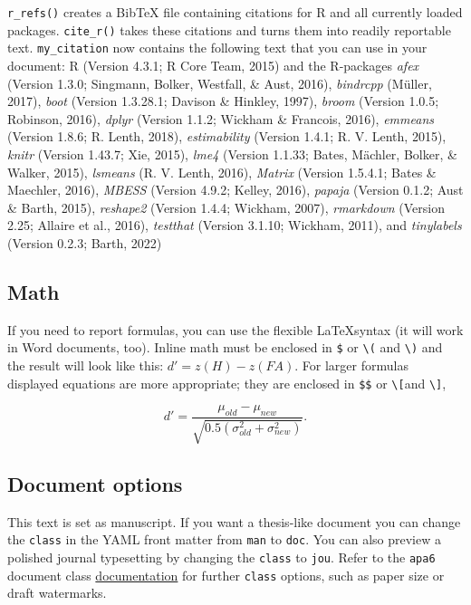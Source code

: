 \documentclass[
  man,floatsintext]{apa6}
\begin{document}
\texttt{r\_refs()} creates a BibTeX file containing citations for R and all currently loaded packages.
\texttt{cite\_r()} takes these citations and turns them into readily reportable text.
\texttt{my\_citation} now contains the following text that you can use in your document: R (Version 4.3.1; R Core Team, 2015) and the R-packages \emph{afex} (Version 1.3.0; Singmann, Bolker, Westfall, \& Aust, 2016), \emph{bindrcpp} (Müller, 2017), \emph{boot} (Version 1.3.28.1; Davison \& Hinkley, 1997), \emph{broom} (Version 1.0.5; Robinson, 2016), \emph{dplyr} (Version 1.1.2; Wickham \& Francois, 2016), \emph{emmeans} (Version 1.8.6; R. Lenth, 2018), \emph{estimability} (Version 1.4.1; R. V. Lenth, 2015), \emph{knitr} (Version 1.43.7; Xie, 2015), \emph{lme4} (Version 1.1.33; Bates, Mächler, Bolker, \& Walker, 2015), \emph{lsmeans} (R. V. Lenth, 2016), \emph{Matrix} (Version 1.5.4.1; Bates \& Maechler, 2016), \emph{MBESS} (Version 4.9.2; Kelley, 2016), \emph{papaja} (Version 0.1.2; Aust \& Barth, 2015), \emph{reshape2} (Version 1.4.4; Wickham, 2007), \emph{rmarkdown} (Version 2.25; Allaire et al., 2016), \emph{testthat} (Version 3.1.10; Wickham, 2011), and \emph{tinylabels} (Version 0.2.3; Barth, 2022)

\subsection{Math}\label{math}

If you need to report formulas, you can use the flexible \LaTeX syntax (it will work in Word documents, too).
Inline math must be enclosed in \texttt{\$} or \texttt{\textbackslash{}(} and \texttt{\textbackslash{})} and the result will look like this: \(d' = z(H) - z(FA)\).
For larger formulas displayed equations are more appropriate; they are enclosed in \texttt{\$\$} or \texttt{\textbackslash{}{[}}and \texttt{\textbackslash{}{]}},

\[
d' = \frac{\mu_{old} - \mu_{new}}{\sqrt{0.5(\sigma^2_{old} + \sigma^2_{new})}}.
\]

\subsection{Document options}\label{document-options}

This text is set as manuscript.
If you want a thesis-like document you can change the \texttt{class} in the YAML front matter from \texttt{man} to \texttt{doc}.
You can also preview a polished journal typesetting by changing the \texttt{class} to \texttt{jou}.
Refer to the \texttt{apa6} document class \href{ftp://ftp.fu-berlin.de/tex/CTAN/macros/latex/contrib/apa6/apa6.pdf}{documentation} for further \texttt{class} options, such as paper size or draft watermarks.
\end{document}
